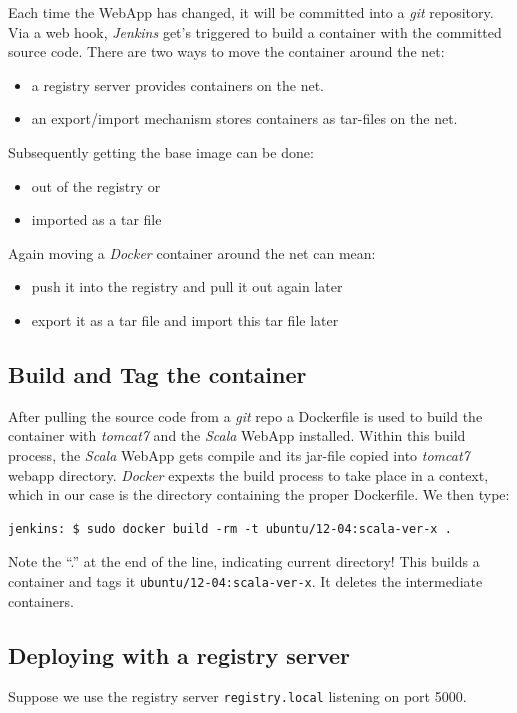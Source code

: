 \documentclass[captions=tableheading]{article}
\begin{document}
Each time the WebApp has changed, it will be committed into a \emph{git} repository. Via a web hook, \emph{Jenkins} get's triggered to build a container with the committed source code. There are two ways to move the container around the net:
\begin{itemize}
\item a registry server provides containers on the net.
\item an export/import mechanism stores containers as tar-files on the net.
\end{itemize}
Subsequently getting  the base image can be done: 
\begin{itemize}
\item out of the registry or
\item imported as a tar file
\end{itemize}
Again moving a \emph{Docker} container around the net can mean: 
\begin{itemize}
\item push it into the registry and pull it out again later
\item export it as a tar file and import this tar file later
\end{itemize}
\subsection{Build and Tag the container}
\label{sec-6-1}

After pulling the source code from a \emph{git} repo a Dockerfile is used to build the container with \emph{tomcat7} and the \emph{Scala} WebApp installed. Within this build process, the \emph{Scala} WebApp gets  compile and its jar-file copied into \emph{tomcat7} webapp directory. \emph{Docker} expexts the build process to take place in a context, which in our case is the directory containing the proper Dockerfile. We then type:

\begin{verbatim}
jenkins: $ sudo docker build -rm -t ubuntu/12-04:scala-ver-x .
\end{verbatim}
Note the ``.'' at the end of the line, indicating current directory! This builds a container and tags it \texttt{ubuntu/12-04:scala-ver-x}. It deletes the intermediate containers.
\subsection{Deploying with a registry server}
\label{sec-6-2}

Suppose we use the registry server \texttt{registry.local} listening on port 5000.
\end{document}
